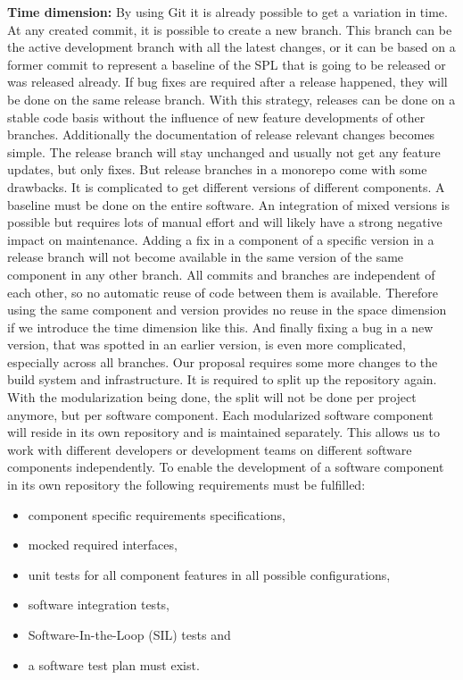 \textbf{Time dimension:} By using Git it is already possible to get a variation
in time. At any created commit, it is possible to create a new branch. This
branch can be the active development branch with all the latest changes, or it
can be based on a former commit to represent a baseline of the SPL that is going
to be released or was released already. If bug fixes are required after a
release happened, they will be done on the same release branch. With this
strategy, releases can be done on a stable code basis without the influence of
new feature developments of other branches. Additionally the documentation of
release relevant changes becomes simple. The release branch will stay unchanged
and usually not get any feature updates, but only fixes. But release branches in
a monorepo come with some drawbacks. It is complicated to get different versions
of different components. A baseline must be done on the entire software. An
integration of mixed versions is possible but requires lots of manual effort and
will likely have a strong negative impact on maintenance. Adding a fix in a
component of a specific version in a release branch will not become available in
the same version of the same component in any other branch. All commits and
branches are independent of each other, so no automatic reuse of code between
them is available. Therefore using the same component and version provides no
reuse in the space dimension if we introduce the time dimension like this. And
finally fixing a bug in a new version, that was spotted in an earlier version,
is even more complicated, especially across all branches. Our proposal requires
some more changes to the build system and infrastructure. It is required to
split up the repository again. With the modularization being done, the split
will not be done per project anymore, but per software component. Each
modularized software component will reside in its own repository and is
maintained separately. This allows us to work with different developers or
development teams on different software components independently. To enable the
development of a software component in its own repository the following
requirements must be fulfilled:
\begin{itemize}
  \item component specific requirements specifications,
  \item mocked required interfaces,
  \item unit tests for all component features in all possible configurations,
  \item software integration tests,
  \item Software-In-the-Loop (SIL) tests and
  \item a software test plan must exist.
\end{itemize}
